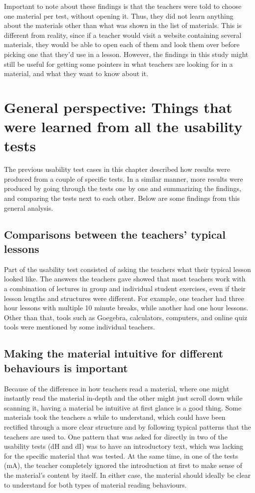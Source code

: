 Important to note about these findings is that the teachers were told to choose one material per test, without opening it. Thus, they did not learn anything about the materials other than what was shown in the list of materials. This is different from reality, since if a teacher would visit a website containing several materials, they would be able to open each of them and look them over before picking one that they'd use in a lesson. However, the findings in this study might still be useful for getting some pointers in what teachers are looking for in a material, and what they want to know about it.

\section{General perspective: Things that were learned from all the usability tests}
The previous usability test cases in this chapter described how results were produced from a couple of specific tests. In a similar manner, more results were produced by going through the tests one by one and summarizing the findings, and comparing the tests next to each other. Below are some findings from this general analysis.

\subsection{Comparisons between the teachers' typical lessons}
Part of the usability test consisted of asking the teachers what their typical lesson looked like. The answers the teachers gave showed that most teachers work with a combination of lectures in group and individual student exercises, even if their lesson lengths and structures were different. For example, one teacher had three hour lessons with multiple 10 minute breaks, while another had one hour lessons. Other than that, tools such as Goegebra, calculators, computers, and online quiz tools were mentioned by some individual teachers.

\subsection{Making the material intuitive for different behaviours is important}
Because of the difference in how teachers read a material, where one might instantly read the material in-depth and the other might just scroll down while scanning it, having a material be intuitive at first glance is a good thing. Some materials took the teachers a while to understand, which could have been rectified through a more clear structure and by following typical patterns that the teachers are used to. One pattern that was asked for directly in two of the usability tests (dH and dI) was to have an introductory text, which was lacking for the specific material that was tested. At the same time, in one of the tests (mA), the teacher completely ignored the introduction at first to make sense of the material's content by itself. In either case, the material should ideally be clear to understand for both types of material reading behaviours.

